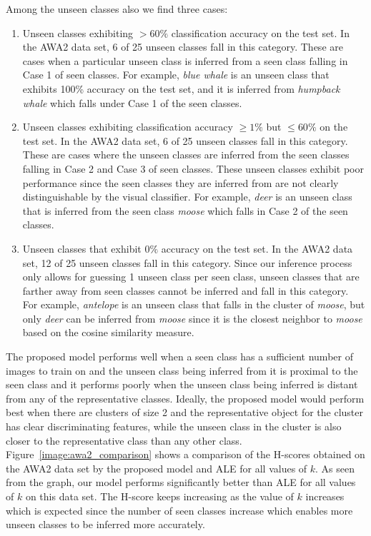 Among the unseen classes also we find three cases:

\begin{enumerate}[label=Unseen Case: \arabic*]
    \item Unseen classes exhibiting $>60\%$  classification accuracy on the test set. In the AWA2 data set, 6 of 25 unseen classes fall in this category. These are cases when a particular unseen class is inferred from a seen class falling in Case 1 of seen classes. For example, \textit{blue whale} is an unseen class that exhibits 100\% accuracy on the test set, and it is inferred from \textit{humpback whale} which falls under Case 1 of the seen classes.
    
    \item Unseen classes exhibiting classification accuracy $\geq  1\%$  but $\leq 60\%$ on the test set. In the AWA2 data set, 6 of 25 unseen classes fall in this category. These are cases where the unseen classes are inferred from the seen classes falling in Case 2 and Case 3 of seen classes. These unseen classes exhibit poor performance since the seen classes they are inferred from are not clearly distinguishable by the visual classifier. For example, \textit{deer} is an unseen class that is inferred from the seen class \textit{moose} which falls in Case 2 of the seen classes.
    
    \item Unseen classes that exhibit $0\%$ accuracy on the test set. In the AWA2 data set, 12 of 25 unseen classes fall in this category. Since our inference process only allows for guessing 1 unseen class per seen class, unseen classes that are farther away from seen classes cannot be inferred and fall in this category. For example, \textit{antelope} is an unseen class that falls in the cluster of \textit{moose}, but only \textit{deer} can be inferred from \textit{moose} since it is the closest neighbor to \textit{moose} based on the cosine similarity measure.
\end{enumerate}

\par
\medskip

The proposed model performs well when a seen class has a sufficient number of images to train on and the unseen class being inferred from it is proximal to the seen class and it performs poorly when the unseen class being inferred is distant from any of the representative classes. Ideally, the proposed model would perform best when there are clusters of size 2 and the representative object for the cluster has clear discriminating features, while the unseen class in the cluster is also closer to the representative class than any other class. Figure~\ref{image:awa2_comparison} shows a comparison of the H-scores obtained on the AWA2 data set by the proposed model and ALE for all values of $k$. As seen from the graph, our model performs significantly better than ALE for all values of $k$ on this data set. The H-score keeps increasing as the value of $k$ increases which is expected since the number of seen classes increase which enables more unseen classes to be inferred more accurately. 

